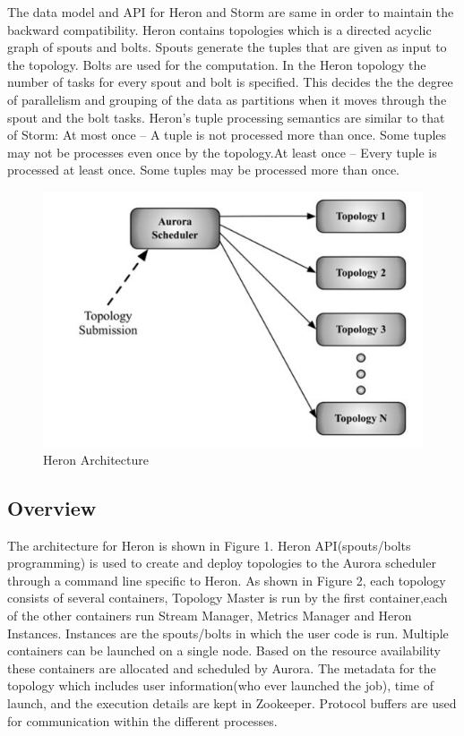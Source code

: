 \documentclass[9pt,twocolumn,twoside]{styles/osajnl}
\begin{document}
The data model and API for Heron and Storm are same in order to maintain the backward compatibility. Heron contains topologies which is a directed acyclic graph of spouts and bolts. Spouts generate the tuples that are given as input to the topology. Bolts are used for the computation. In the Heron topology the number of tasks for every spout and bolt is specified. This decides the the degree of parallelism and grouping of the data as partitions when it moves through the spout and the bolt tasks. Heron’s tuple processing semantics are similar to that of Storm: At most once – A tuple is not processed more than once. Some tuples may not be processes even once by the topology.At least once – Every tuple is processed at least once. Some tuples may be processed more than once.\cite{TwitterHeron2}
\begin{figure}[htbp]
\begin{center}
\centering
\includegraphics[width=\linewidth]{images/img1}
\caption{Heron Architecture}
\label{fig:false-color}
\end{center}
\end{figure}
\subsection{Overview}
The architecture for Heron is shown in Figure 1. Heron API(spouts/bolts programming) is used to create and
deploy topologies to the Aurora scheduler through a command line specific to Heron. As shown in Figure 2, each topology consists of several containers, Topology Master is run by the first container,each of the other containers run Stream Manager, Metrics Manager and Heron Instances. Instances are the spouts/bolts in which the user code is run. Multiple containers can be launched on a single node. Based on the resource availability these containers are allocated and scheduled by Aurora. The metadata for the topology which includes user information(who ever launched the job), time of launch, and the execution details are kept in Zookeeper. Protocol buffers  are used for communication within the different processes.
\end{document}
